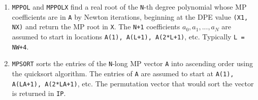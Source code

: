 \begin{enumerate}
\item {\tt MPPOL} and {\tt MPPOLX} find a real root of the {\tt N}-th
degree polynomial whose MP coefficients are in {\tt A} by Newton
iterations, beginning at the DPE value {\tt (X1, NX)} and return the
MP root in {\tt X}.  The {\tt N+1} coefficients $a_0, a_1, ..., a_N$
are assumed to start in locations {\tt A(1), A(L+1), A(2*L+1)}, etc.
Typically {\tt L = NW+4}.

\item {\tt MPSORT} sorts the entries of the {\tt N}-long MP vector
{\tt A} into ascending order using the quicksort algorithm.  The
entries of {\tt A} are assumed to start at {\tt A(1), A(LA+1),
A(2*LA+1)}, etc. The permutation vector that would sort the vector is
returned in {\tt IP}.

\end{enumerate}




